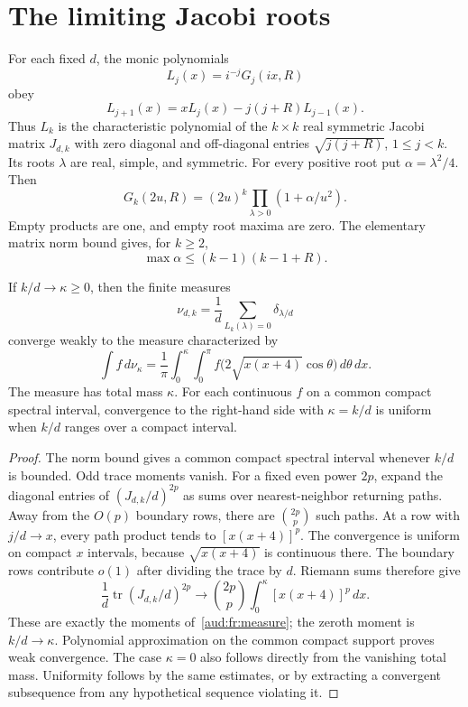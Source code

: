 \section{The limiting Jacobi roots}
For each fixed $d$, the monic polynomials
\[
 L_j(x)=i^{-j}G_j(ix,R)
\]
obey
\[
 L_{j+1}(x)=xL_j(x)-j(j+R)L_{j-1}(x).
\]
Thus $L_k$ is the characteristic polynomial of the $k\times k$ real symmetric Jacobi matrix $J_{d,k}$ with zero diagonal and off-diagonal entries $\sqrt{j(j+R)}$, $1\le j<k$. Its roots $\lambda$ are real, simple, and symmetric. For every positive root put $\alpha=\lambda^2/4$. Then
\begin{equation}\label{aud:fr:rootproduct}
 G_k(2u,R)=(2u)^k\prod_{\lambda>0}(1+\alpha/u^2).
\end{equation}
Empty products are one, and empty root maxima are zero. The elementary matrix norm bound gives, for $k\ge2$,
\begin{equation}\label{aud:fr:rootbound}
 \max\alpha\le(k-1)(k-1+R).
\end{equation}

\begin{lemma}\label{aud:fr:measurelemma}
If $k/d\to\kappa\ge0$, then the finite measures
\[
 \nu_{d,k}=\frac1d\sum_{L_k(\lambda)=0}\delta_{\lambda/d}
\]
converge weakly to the measure characterized by
\begin{equation}\label{aud:fr:measure}
 \int f\,d\nu_\kappa
 =\frac1\pi\int_0^\kappa\int_0^\pi
 f\bigl(2\sqrt{x(x+4)}\cos\theta\bigr)\,d\theta\,dx.
\end{equation}
The measure has total mass $\kappa$. For each continuous $f$ on a common compact spectral interval, convergence to the right-hand side with $\kappa=k/d$ is uniform when $k/d$ ranges over a compact interval.
\end{lemma}
\begin{proof}
The norm bound gives a common compact spectral interval whenever $k/d$ is bounded. Odd trace moments vanish. For a fixed even power $2p$, expand the diagonal entries of $(J_{d,k}/d)^{2p}$ as sums over nearest-neighbor returning paths. Away from the $O(p)$ boundary rows, there are $\binom{2p}{p}$ such paths. At a row with $j/d\to x$, every path product tends to $[x(x+4)]^p$. The convergence is uniform on compact $x$ intervals, because $\sqrt{x(x+4)}$ is continuous there. The boundary rows contribute $o(1)$ after dividing the trace by $d$. Riemann sums therefore give
\[
 \frac1d\operatorname{tr}(J_{d,k}/d)^{2p}
 \longrightarrow\binom{2p}{p}\int_0^\kappa[x(x+4)]^p\,dx.
\]
These are exactly the moments of~\eqref{aud:fr:measure}; the zeroth moment is $k/d\to\kappa$. Polynomial approximation on the common compact support proves weak convergence. The case $\kappa=0$ also follows directly from the vanishing total mass. Uniformity follows by the same estimates, or by extracting a convergent subsequence from any hypothetical sequence violating it.
\end{proof}

